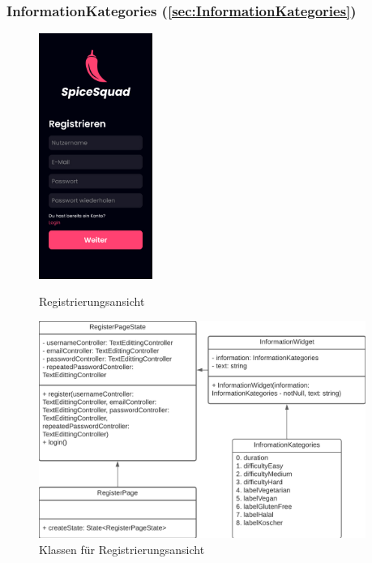 \documentclass[parskip=full]{scrartcl}
\begin{document}
    \subsubsection{InformationKategories (\autoref{sec:InformationKategories})}
    \begin{figure}[htp]
        \begin{minipage}
            [t]{0.49\textwidth}
            \centering
            \includegraphics[height=80mm]{images/Presentation-layer/RegisterView.jpg}
            \caption{Registrierungsansicht}
        \end{minipage}
        \begin{minipage}
            [t]{0.49\textwidth}
            \centering
            \includegraphics[width=0.95\textwidth]{images/Presentation-layer/RegisterViewClass.png}
            \caption{Klassen für Registrierungsansicht}
        \end{minipage}
    \end{figure}    
        
\end{document}

